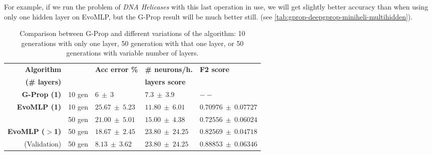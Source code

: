 \documentclass[conference]{IEEEtran}\usepackage[]{graphicx}\usepackage[]{color}
\begin{document}

For example, if we run the problem of \emph{DNA Helicases} with this last
operation in use, we will get slightly better accuracy than when using only one
hidden layer on {\sf EvoMLP}, but the G-Prop result will be much better still. (see
\autoref{tab:gprop-deepgprop-miniheli-multihidden}). %

\begin{table*}
    \centering
    \caption{
        Comparison between G-Prop and different variations of the algorithm: 10
        generations with only one layer, 50 generation with that one layer, or
        50 generations with variable number of layers.
    }
    \label{tab:gprop-deepgprop-miniheli-multihidden}
    \begin{tabular}{rllll}
        \textbf{Algorithm} &  & \textbf{Acc error \%} & \textbf{\# neurons/h.}     & \textbf{F2 score}\\
        \textbf{(\# layers)}& &                       & \textbf{layers score}          &                   \\
        \hline
        \textbf{G-Prop (1)}       & 10 gen & $6\ \pm\ 3$        & $7.3\ \pm\ 3.9$     & $--$                    \\
        \textbf{{\sf EvoMLP} (1)}    & 10 gen & $25.67\ \pm\ 5.23$ & $11.80\ \pm\ 6.01$  & $0.70976\ \pm\ 0.07727$ \\
                                  & 50 gen & $21.00\ \pm\ 5.01$ & $15.00\ \pm\ 4.38$  & $0.72556\ \pm\ 0.06024$ \\
        \textbf{{\sf EvoMLP} ($>$1)} & 50 gen & $18.67\ \pm\ 2.45$ & $23.80\ \pm\ 24.25$ & $0.82569\ \pm\ 0.04718$ \\
        (Validation) & 50 gen &  $8.13\ \pm\ 3.62$ & $23.80\ \pm\ 24.25$ & $0.88853\ \pm\ 0.06346$ \\
    \end{tabular}
\end{table*}

\end{document}
